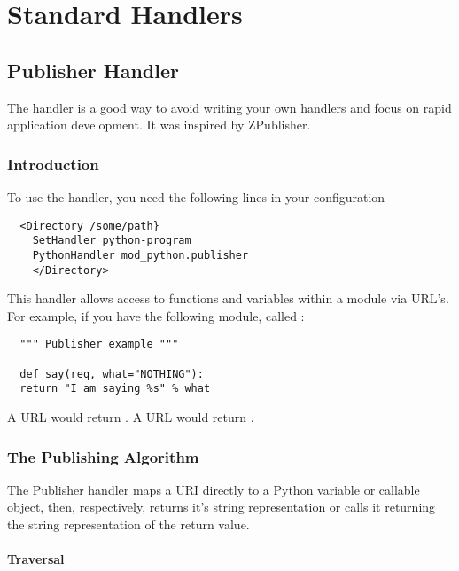 \chapter{Standard Handlers\label{handlers}}

\section{Publisher Handler\label{hand-pub}}

The  handler is a good way to avoid writing your own
handlers and focus on rapid application development. It was inspired
by  ZPublisher.

\subsection{Introduction\label{hand-pub-intro}}

To use the handler, you need the following lines in your configuration
\begin{verbatim}
  <Directory /some/path}
    SetHandler python-program 
    PythonHandler mod_python.publisher
    </Directory>
\end{verbatim}

This handler allows access to functions and variables within a module
via URL's. For example, if you have the following module, called 
:

\begin{verbatim}
  """ Publisher example """

  def say(req, what="NOTHING"):
  return "I am saying %s" % what

\end{verbatim}

A URL  would return 
. A URL 
 would
return .

\subsection{The Publishing Algorithm\label{hand-pub-alg}}

The Publisher handler maps a URI directly to a Python variable or
callable object, then, respectively, returns it's string
representation or calls it returning the string representation of the
return value.

\subsubsection{Traversal\label{hand-pub-alg-trav}}

